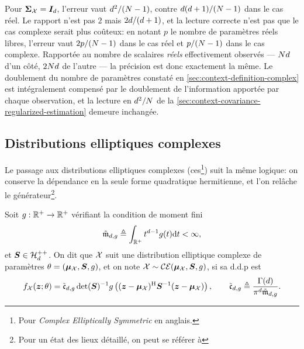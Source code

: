 \begin{remark}
  Pour $\boldsymbol{\Sigma}_{\mathcal{X}}=\boldsymbol{I}_{d}$, l'erreur vaut $d^2/(N-1)$, contre $d(d+1)/(N-1)$ dans le cas réel. Le rapport n'est pas $2$ mais $2d/(d+1)$, et la lecture correcte n'est pas que le cas complexe serait plus coûteux: en notant $p$ le nombre de paramètres réels libres, l'erreur vaut $2p/(N-1)$ dans le cas réel et $p/(N-1)$ dans le cas complexe. Rapportée au nombre de scalaires \emph{réels} effectivement observés — $Nd$ d'un côté, $2Nd$ de l'autre — la précision est donc exactement la même. Le doublement du nombre de paramètres constaté en \cref{sec:context-definition-complex} est intégralement compensé par le doublement de l'information apportée par chaque observation, et la lecture en $d^2/N$ de la \cref{sec:context-covariance-regularized-estimation} demeure inchangée.
\end{remark}

\subsection{Distributions elliptiques complexes}

Le passage aux distributions elliptiques complexes (ces\footnote{Pour \emph{Complex Elliptically Symmetric} en anglais.}) suit la même logique: on conserve la dépendance en la seule forme quadratique hermitienne, et l'on relâche le générateur\footnote{Pour un état des lieux détaillé, on peut se référer à }.

\begin{definition}
\label{def:context-complex-ces}
  Soit $g:\mathbb{R}^+\to\mathbb{R}^+$ vérifiant la condition de moment fini
  \begin{equation}
    \tilde{\mathfrak{m}}_{d,g}
    \triangleq
    \int_{\mathbb{R}^+} t^{d-1}g(t)\mathrm{d} t < \infty,
    \label{eq:context-complex-momentfini}
  \end{equation}
  et $\boldsymbol{S}\in\mathcal{H}_{d}^{++}$. On dit que $\mathcal{X}$ suit une distribution elliptique complexe de paramètres $\theta=(\boldsymbol{\mu}_{\mathcal{X}},\boldsymbol{S},g)$, et on note $\mathcal{X}\sim\mathcal{CE}(\boldsymbol{\mu}_{\mathcal{X}},\boldsymbol{S},g)$, si sa d.d.p est
  \begin{equation}
    f_{\mathcal{X}}(\boldsymbol{z};\theta)
    =
    \tilde{\mathfrak{c}}_{d,g}\operatorname{\operatorname{det}}(\boldsymbol{S})^{-1}
    g\left((\boldsymbol{z}-\boldsymbol{\mu}_{\mathcal{X}})^{\mathrm{H}} {\boldsymbol{S}}^{-1} (\boldsymbol{z}-\boldsymbol{\mu}_{\mathcal{X}})\right),
    \qquad
    \tilde{\mathfrak{c}}_{d,g}
    \triangleq
    \frac{\Gamma(d)}{\pi^d\tilde{\mathfrak{m}}_{d,g}}.
    \label{eq:context-complex-cespdf}
  \end{equation}
\end{definition}

